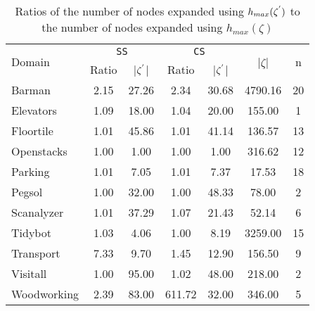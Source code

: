 \begin{table}[]
\centering
\caption{Ratios of the number of nodes expanded using $h_{max}(\zeta\sp{'})$ to the number of nodes expanded using $h_{max}(\zeta)$}
\begin{tabular}{lcccccc}
\hline
\multirow{2}{*}{Domain} & \multicolumn{2}{c}{\texttt{SS}} & \multicolumn{2}{c}{\texttt{CS}}   & \multirow{2}{*}{|$\zeta$|} & \multirow{2}{*}{n} \\ \cline{2-5}
                        & Ratio    & |$\zeta\sp{'}$|   & Ratio  & |$\zeta\sp{'}$| &                            &                    \\ \hline
Barman                  & 2.15     & 27.26       & 2.34   & 30.68           & 4790.16                    & 20                 \\
Elevators               & 1.09     & 18.00       & 1.04   & 20.00           & 155.00                     & 1                  \\
Floortile               & 1.01     & 45.86       & 1.01   & 41.14           & 136.57                     & 13                 \\
Openstacks              & 1.00     & 1.00        & 1.00   & 1.00            & 316.62                     & 12                 \\
Parking                 & 1.01     & 7.05        & 1.01   & 7.37            & 17.53                      & 18                 \\
Pegsol                  & 1.00     & 32.00       & 1.00   & 48.33           & 78.00                      & 2                  \\
Scanalyzer              & 1.01     & 37.29       & 1.07   & 21.43           & 52.14                      & 6                  \\
Tidybot                 & 1.03     & 4.06        & 1.00   & 8.19            & 3259.00                    & 15                 \\
Transport               & 7.33     & 9.70        & 1.45   & 12.90           & 156.50                     & 9                  \\
Visitall                & 1.00     & 95.00       & 1.02   & 48.00           & 218.00                     & 2                  \\
Woodworking             & 2.39     & 83.00       & 611.72 & 32.00           & 346.00                     & 5                  \\ \hline
\end{tabular}
\label{tb_one}
\end{table}

